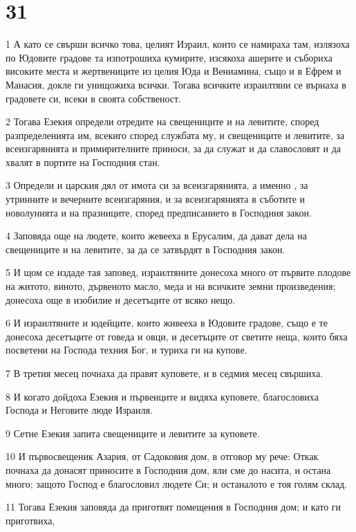 \chapter{31}

\par 1 А като се свърши всичко това, целият Израил, които се намираха там, излязоха по Юдовите градове та изпотрошиха кумирите, изсякоха ашерите и събориха високите места и жертвениците из целия Юда и Вениамина, също и в Ефрем и Манасия, докле ги унищожиха всички. Тогава всичките израилтяни се върнаха в градовете си, всеки в своята собственост.
\par 2 Тогава Езекия определи отредите на свещениците и на левитите, според разпределенията им, всекиго според службата му, и свещениците и левитите, за всеизгарянията и примирителните приноси, за да служат и да славословят и да хвалят в портите на Господния стан.
\par 3 Определи и царския дял от имота си за всеизгарянията, а именно , за утринните и вечерните всеизгаряния, и за всеизгарянията в съботите и новолунията и на празниците, според предписанието в Господния закон.
\par 4 Заповяда още на людете, които жевееха в Ерусалим, да дават дела на свещениците и на левитите, за да се затвърдят в Господния закон.
\par 5 И щом се издаде тая заповед, израилтяните донесоха много от първите плодове на житото, виното, дървеното масло, меда и на всичките земни произведения; донесоха още в изобилие и десетъците от всяко нещо.
\par 6 И израилтяните и юдейците, които живееха в Юдовите градове, също е те донесоха десетъците от говеда и овци, и десетъците от светите неща, които бяха посветени на Господа техния Бог, и туриха ги на купове.
\par 7 В третия месец почнаха да правят куповете, и в седмия месец свършиха.
\par 8 И когато дойдоха Езекия и първенците и видяха куповете, благословиха Господа и Неговите люде Израиля.
\par 9 Сетне Езекия запита свещениците и левитите за куповете.
\par 10 И първосвещеник Азария, от Садоковия дом, в отговор му рече: Откак почнаха да донасят приносите в Господния дом, яли сме до насита, и остана много; защото Господ е благословил людете Си; и останалото е тоя голям склад.
\par 11 Тогава Езекия заповяда да приготвят помещения в Господния дом; и като ги приготвиха,
